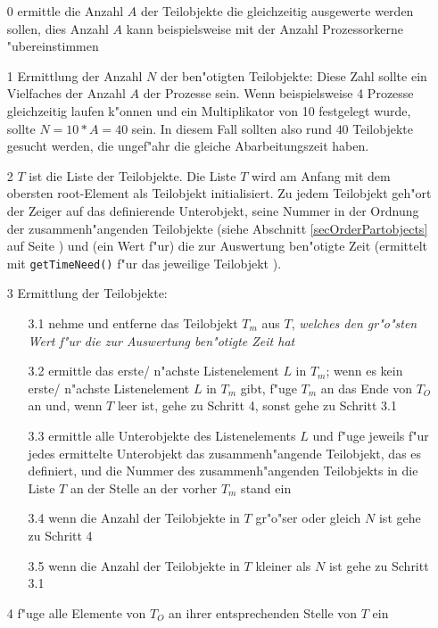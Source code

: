 \begin{itemize}
 \item [0] ermittle die Anzahl $A$ der Teilobjekte die gleichzeitig ausgewerte werden sollen, dies Anzahl $A$ kann beispielsweise mit der Anzahl Prozessorkerne "ubereinstimmen
 \item [1] Ermittlung der Anzahl $N$ der ben"otigten Teilobjekte: Diese Zahl sollte ein Vielfaches der Anzahl $A$ der Prozesse sein. Wenn beispielsweise 4 Prozesse gleichzeitig laufen k"onnen und ein Multiplikator von 10 festgelegt wurde, sollte $N=10*A=40$ sein. In diesem Fall sollten also rund $40$ Teilobjekte gesucht werden, die ungef"ahr die gleiche Abarbeitungszeit haben.
 \item [2] $T$ ist die Liste der Teilobjekte. Die Liste $T$ wird am Anfang mit dem obersten root-Element als Teilobjekt initialisiert. Zu jedem Teilobjekt geh"ort der Zeiger auf das definierende Unterobjekt, seine Nummer in der Ordnung der zusammenh"angenden Teilobjekte (siehe Abschnitt \ref{secOrderPartobjects} auf Seite \pageref{secOrderPartobjects}) und (ein Wert f"ur) die zur Auswertung ben"otigte Zeit (ermittelt mit \verb|getTimeNeed()| f"ur das jeweilige Teilobjekt ).
 \item [3] Ermittlung der Teilobjekte:
 \begin{itemize}
  \item [3.1] nehme und entferne das Teilobjekt $T_m$ aus $T$, \emph{welches den gr"o"sten Wert f"ur die zur Auswertung ben"otigte Zeit hat}
  \item [3.2] ermittle das erste/ n"achste Listenelement $L$ in $T_m$; wenn es kein erste/ n"achste Listenelement $L$ in $T_m$ gibt, f"uge $T_m$ an das Ende von $T_O$ an und, wenn $T$ leer ist, gehe zu Schritt 4, sonst gehe zu Schritt 3.1
  \item [3.3] ermittle alle Unterobjekte des Listenelements $L$ und f"uge jeweils f"ur jedes ermittelte Unterobjekt das zusammenh"angende Teilobjekt, das es definiert, und die Nummer des zusammenh"angenden Teilobjekts in die Liste $T$ an der Stelle an der vorher $T_m$ stand ein
  \item [3.4] wenn die Anzahl der Teilobjekte in $T$ gr"o"ser oder gleich $N$ ist gehe zu Schritt 4
  \item [3.5] wenn die Anzahl der Teilobjekte in $T$ kleiner als $N$ ist gehe zu Schritt 3.1
 \end{itemize}
 \item [4] f"uge alle Elemente von $T_O$ an ihrer entsprechenden Stelle von $T$ ein

\end{itemize}
